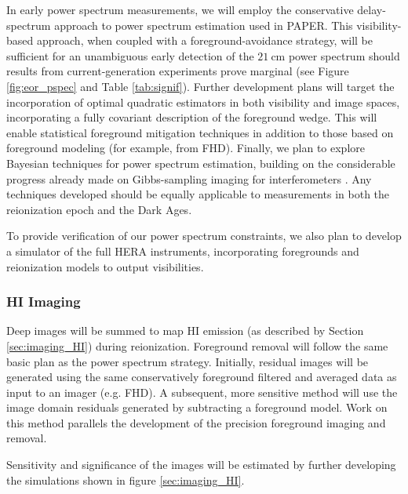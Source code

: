 \documentclass[preprint]{aastex}
\begin{document}
In early power spectrum measurements, we will employ the conservative delay-spectrum approach to power spectrum estimation used in PAPER.  This visibility-based approach, when coupled with a foreground-avoidance strategy, will be sufficient for an unambiguous early detection of the $21~\textrm{cm}$ power spectrum should results from current-generation experiments prove marginal (see Figure \ref{fig:eor_pspec} and Table \ref{tab:signif}).  Further development plans will target the incorporation of optimal quadratic estimators \citep{liu_tegmark2011,dillon_et_al2013a} in both visibility and image spaces, incorporating a fully covariant description of the foreground wedge.  This will enable statistical foreground mitigation techniques in addition to those based on foreground modeling (for example, from FHD).  Finally, we plan to explore Bayesian techniques for power spectrum estimation, building on the considerable progress already made on Gibbs-sampling imaging for interferometers \cite{sutter_et_al2014}.  Any techniques developed should be equally applicable to measurements in both the reionization epoch and the Dark Ages.

To provide verification of our power spectrum constraints, we also plan to develop a simulator of the full HERA instruments, incorporating foregrounds and reionization models to output visibilities.

\subsubsection{HI Imaging}
Deep images will be summed to map HI emission (as described by Section \ref{sec:imaging_HI}) during reionization.   Foreground removal will follow the same basic plan as the power spectrum strategy.  Initially, residual images will be generated using the same conservatively foreground filtered and averaged data as input to an imager (e.g. FHD).  A subsequent, more sensitive method will use the image domain residuals generated by subtracting a foreground model.  Work on this method parallels the development of the precision foreground imaging and removal.

Sensitivity and significance of the images will be estimated by further developing the simulations shown in figure \ref{sec:imaging_HI}.  


%
\end{document}
